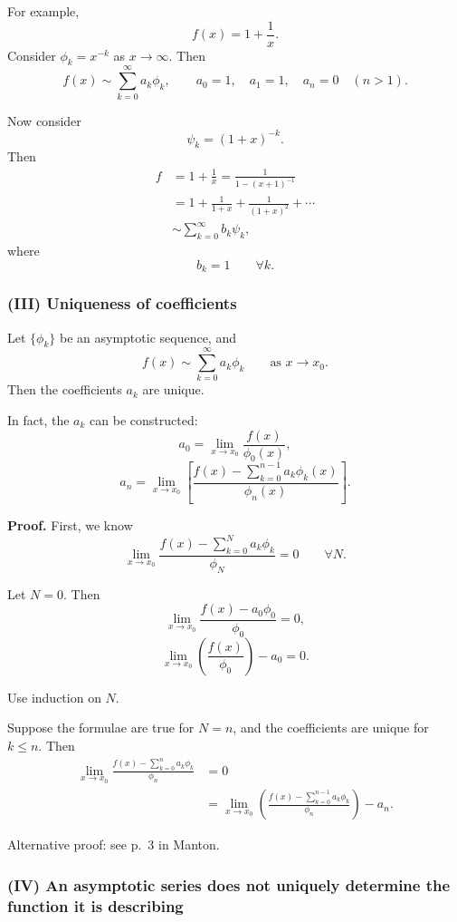 \documentclass[11pt,a4paper]{article}
\begin{document}
For example,
\[
f(x) = 1 + \frac{1}{x}.
\]
Consider \(\phi_k = x^{-k}\) as \(x \to \infty\). Then
\[
f(x) \sim \sum_{k=0}^{\infty} a_k \phi_k,
\qquad
a_0 = 1,\quad a_1 = 1,\quad a_n = 0 \quad (n>1).
\]

Now consider
\[
\psi_k = (1+x)^{-k}.
\]
Then
\[
\begin{aligned}
f
&= 1 + \frac{1}{x}
 = \frac{1}{1-(x+1)^{-1}} \\
&= 1 + \frac{1}{1+x} + \frac{1}{(1+x)^2} + \cdots \\
&\sim \sum_{k=0}^{\infty} b_k \psi_k,
\end{aligned}
\]
where
\[
b_k = 1 \qquad \forall k.
\]

\subsubsection*{(III) Uniqueness of coefficients}

Let \(\{\phi_k\}\) be an asymptotic sequence, and
\[
f(x) \sim \sum_{k=0}^{\infty} a_k \phi_k
\qquad \text{as } x \to x_0.
\]
Then the coefficients \(a_k\) are unique.

In fact, the \(a_k\) can be constructed:
\[
a_0 = \lim_{x \to x_0} \frac{f(x)}{\phi_0(x)},
\]
\[
a_n = \lim_{x \to x_0}
\left[
\frac{f(x)-\displaystyle\sum_{k=0}^{n-1} a_k\phi_k(x)}
{\phi_n(x)}
\right].
\]

\noindent
\textbf{Proof.} First, we know
\[
\lim_{x \to x_0}
\frac{f(x)-\displaystyle\sum_{k=0}^{N} a_k\phi_k}
{\phi_N}
= 0
\qquad \forall N.
\]

Let \(N=0\). Then
\[
\lim_{x \to x_0}
\frac{f(x)-a_0\phi_0}{\phi_0}
= 0,
\]
\[
\lim_{x \to x_0}
\left(\frac{f(x)}{\phi_0}\right)-a_0
= 0.
\]

Use induction on \(N\).

Suppose the formulae are true for \(N=n\), and the coefficients are
unique for \(k \le n\). Then
\[
\begin{aligned}
\lim_{x \to x_0}
\frac{f(x)-\displaystyle\sum_{k=0}^{n} a_k\phi_k}
{\phi_n}
&= 0 \\
&=
\lim_{x \to x_0}
\left(
\frac{f(x)-\displaystyle\sum_{k=0}^{n-1} a_k\phi_k}
{\phi_n}
\right)-a_n.
\end{aligned}
\]

\noindent
Alternative proof: see p.~3 in Manton.

\subsubsection*{(IV) An asymptotic series does not uniquely determine
the function it is describing}
\end{document}

